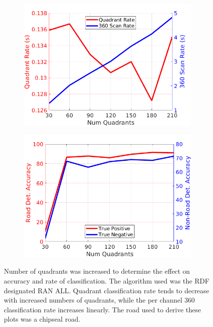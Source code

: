 \documentclass[journal,onecolumn]{IEEEtran}
\begin{document}
	\begin{figure}[H]
		\centering
		\begin{subfigure}{0.45\textwidth}
			\centering
			\includegraphics[width=0.95\linewidth]{figures/class_rate_2}
			\caption[]{}
			\label{fig:quad_vs_scan}
		\end{subfigure}
		\begin{subfigure}{0.45\textwidth}
			\centering
			\includegraphics[width=0.95\linewidth]{figures/accs_v_size_2}
			\caption[]{}
			\label{fig:accs_v_size}
		\end{subfigure}
		\caption[Quadrant Num]{Number of quadrants was increased to determine the effect on accuracy and rate of classification. The algorithm used was the RDF designated RAN ALL. Quadrant classification rate tends to decrease with increased numbers of quadrants, while the per channel 360 classification rate increases linearly. The road used to derive these plots was a chipseal road.}
		\label{fig:quadrant_size_comps}
	\end{figure}
\end{document}
